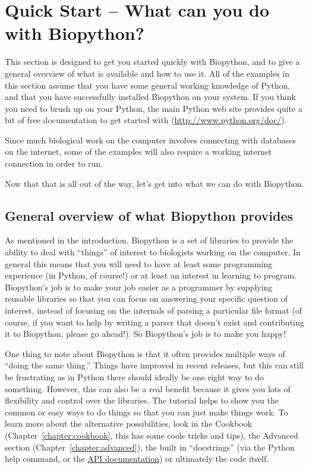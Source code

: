 \documentclass{report}
\begin{document}
\chapter{Quick Start -- What can you do with Biopython?}
\label{chapter:quick-start}

This section is designed to get you started quickly with Biopython, and to give a general overview of what is available and how to use it. All of the examples in this section assume that you have some general working knowledge of Python, and that you have successfully installed Biopython on your system. If you think you need to brush up on your Python, the main Python web site provides quite a bit of free documentation to get started with (\url{http://www.python.org/doc/}).

Since much biological work on the computer involves connecting with databases on the internet, some of the examples will also require a working internet connection in order to run.

Now that that is all out of the way, let's get into what we can do with Biopython.

\section{General overview of what Biopython provides}

As mentioned in the introduction, Biopython is a set of libraries to provide the ability to deal with ``things'' of interest to biologists working on the computer. In general this means that you will need to have at least some programming experience (in Python, of course!) or at least an interest in learning to program. Biopython's job is to make your job easier as a programmer by supplying reusable libraries so that you can focus on answering your specific question of interest, instead of focusing on the internals of parsing a particular file format (of course, if you want to help by writing a parser that doesn't exist and contributing it to Biopython, please go ahead!). So Biopython's job is to make you happy!

One thing to note about Biopython is that it often provides multiple ways of ``doing the same thing.'' Things have improved in recent releases, but this can still be frustrating as in Python there should ideally be one right way to do something. However, this can also be a real benefit because it gives you lots of flexibility and control over the libraries. The tutorial helps to show you the common or easy ways to do things so that you can just make things work. To learn more about the alternative possibilities, look in the Cookbook (Chapter~\ref{chapter:cookbook}, this has some cools tricks and tips), the Advanced section (Chapter~\ref{chapter:advanced}), the built in ``docstrings'' (via the Python help command, or the \href{http://biopython.org/DIST/docs/api/}{API documentation}) or ultimately the code itself.
\end{document}

